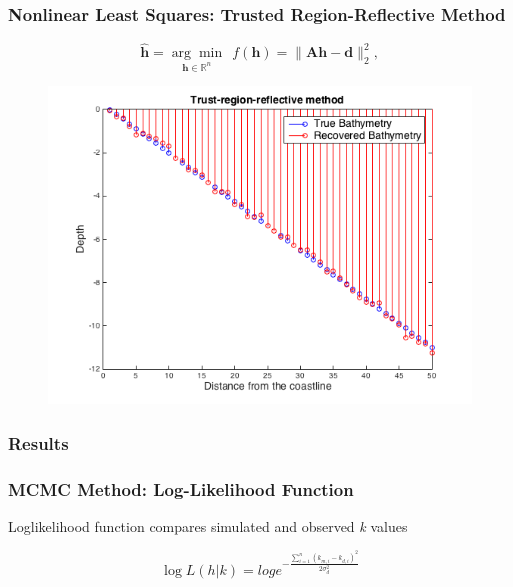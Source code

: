\documentclass[7pt]{beamer}
\begin{document}
 \begin{frame}
\frametitle{Nonlinear Least Squares: Trusted Region-Reflective Method}

\begin{equation}\label{LS}
\mathbf{\hat{h}}= \underset{\mathbf{h} \in \mathbb{R}^n}{\arg \min} \ \ f(\mathbf{h}) = \|  \mathbf{A}\mathbf{h} -  \mathbf{d} \|_2^2,
\end{equation}

\begin{figure}[H]
	 	\centering
	 	\includegraphics[width=.70\linewidth]{img/trust_region_linear.png}
	 	\end{figure}

\end{frame}

 \begin{frame}
\frametitle{Results}


\end{frame}






\begin{frame}
 \frametitle{MCMC Method: Log-Likelihood Function}
 Loglikelihood function compares simulated and observed \textit{k} values

\begin{equation} \label{likely}
\log{L(h|%
k)}=log{e^{- \frac{\sum\limits_{i=1}^n({k}_{m,i}-k_{d,i})^2}{2\sigma_{d}^2}}}
\end{equation} 


\end{frame}
\end{document}
